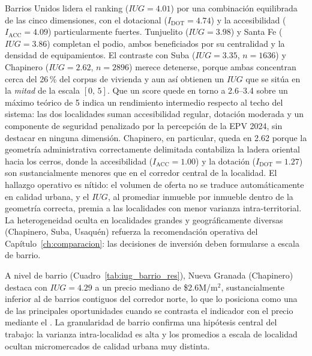 \documentclass[12pt, a4paper, twoside, openright]{report}
\theoremstyle{plain}
\theoremstyle{definition}
\newcommand{\IACC}{I_{\text{ACC}}} %
\newcommand{\IDOT}{I_{\text{DOT}}} %
\newcommand{\IUG}{IUG}             %
\begin{document}
Barrios Unidos lidera el ranking ($\IUG{} = 4.01$) por una combinación equilibrada de las cinco dimensiones, con el dotacional ($\IDOT = 4.74$) y la accesibilidad ($\IACC = 4.09$) particularmente fuertes. Tunjuelito ($\IUG{} = 3.98$) y Santa Fe ($\IUG{} = 3.86$) completan el podio, ambos beneficiados por su centralidad y la densidad de equipamientos. El contraste con Suba ($\IUG{} = 3.35$, $n = \num{1636}$) y Chapinero ($\IUG{} = 2.62$, $n = \num{2896}$) merece detenerse, porque ambas concentran cerca del 26\,\% del corpus de vivienda y aun así obtienen un $\IUG{}$ que se sitúa en la \emph{mitad} de la escala $[0,\,5]$. Que un score quede en torno a 2.6--3.4 sobre un máximo teórico de 5 indica un rendimiento intermedio respecto al techo del sistema: las dos localidades suman accesibilidad regular, dotación moderada y un componente de seguridad penalizado por la percepción de la EPV 2024, sin destacar en ninguna dimensión. Chapinero, en particular, queda en 2.62 porque la geometría administrativa correctamente delimitada contabiliza la ladera oriental hacia los cerros, donde la accesibilidad ($\IACC = 1.00$) y la dotación ($\IDOT = 1.27$) son sustancialmente menores que en el corredor central de la localidad. El hallazgo operativo es nítido: el volumen de oferta no se traduce automáticamente en calidad urbana, y el $\IUG{}$, al promediar inmueble por inmueble dentro de la geometría correcta, premia a las localidades con menor varianza intra-territorial. La heterogeneidad oculta en localidades grandes y geográficamente diversas (Chapinero, Suba, Usaquén) refuerza la recomendación operativa del Capítulo~\ref{ch:comparacion}: las decisiones de inversión deben formularse a escala de barrio.

A nivel de barrio (Cuadro~\ref{tab:iug_barrio_res}), Nueva Granada (Chapinero) destaca con $\IUG{} = 4.29$ a un precio mediano de \$2.6M/m$^2$, sustancialmente inferior al de barrios contiguos del corredor norte, lo que lo posiciona como una de las principales oportunidades cuando se contrasta el indicador con el precio mediante el \ratio{}. La granularidad de barrio confirma una hipótesis central del trabajo: la varianza intra-localidad es alta y los promedios a escala de localidad ocultan micromercados de calidad urbana muy distinta.
\end{document}
